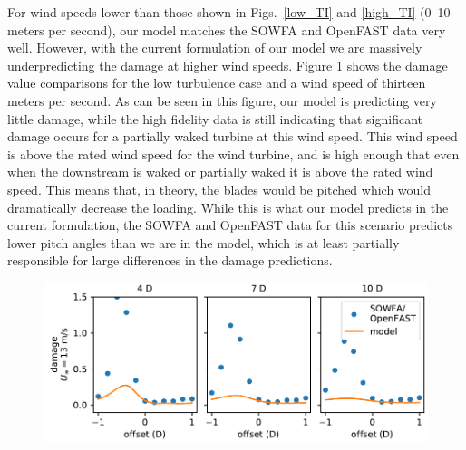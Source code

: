 \documentclass[11pt,letterpaper]{article}
\begin{document}
For wind speeds lower than those shown in Figs.~\ref{low_TI} and \ref{high_TI} (0--10 meters per second), our model matches the SOWFA and OpenFAST data very well. However, with the current formulation of our model we are massively underpredicting the damage at higher wind speeds. Figure \ref{thirteen} shows the damage value comparisons for the low turbulence case and a wind speed of thirteen meters per second. As can be seen in this figure, our model is predicting very little damage, while the high fidelity data is still indicating that significant damage occurs for a partially waked turbine at this wind speed. This wind speed is above the rated wind speed for the wind turbine, and is high enough that even when the downstream is waked or partially waked it is above the rated wind speed. This means that, in theory, the blades would be pitched which would dramatically decrease the loading. While this is what our model predicts in the current formulation, the SOWFA and OpenFAST data for this scenario predicts lower pitch angles than we are in the model, which is at least partially responsible for large differences in the damage predictions.
% 
\begin{figure}
    \centering
    \includegraphics{images/damage_13.pdf}
    \caption{}
    \label{thirteen}
\end{figure}
\end{document}
